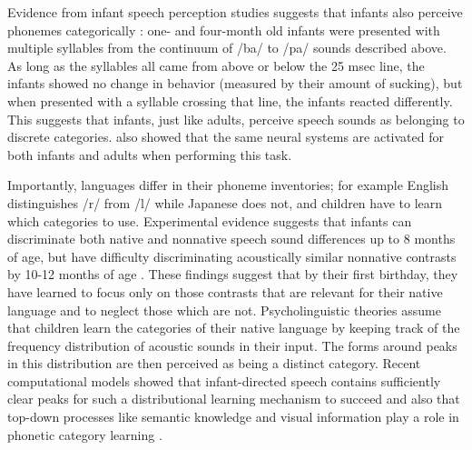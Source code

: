 Evidence from infant speech perception studies suggests that infants
also perceive phonemes categorically  \citep{eimas1971speech}: one-
and four-month old infants were presented with multiple syllables from
the continuum of /ba/ to /pa/ sounds described above. As long as the
syllables all came from above or below the 25 msec line, the infants
showed no change in behavior (measured by their amount of sucking),
but when presented with a syllable crossing that line, the infants
reacted differently. This suggests that infants, just like adults, perceive speech sounds as belonging to discrete categories. \citet{dehaene2004common} also showed that the same neural systems are activated for both infants and adults when performing this task.

Importantly, languages differ in their phoneme inventories; for example English distinguishes /r/ from /l/ while Japanese does not, and children have to learn which categories to use. Experimental evidence suggests that infants can discriminate both native and nonnative speech sound differences up to 8 months of age, but have difficulty discriminating acoustically similar nonnative contrasts by 10-12 months of age \citep{werker2015critical}. These findings suggest that by their first birthday, they have learned to focus only on those contrasts that are relevant for their native language and to neglect those which are not. Psycholinguistic theories assume that children learn the categories of their native language by keeping track of the frequency distribution of acoustic sounds in their input. The forms around peaks in this distribution are then perceived as being a distinct category. Recent computational models showed that infant-directed speech contains sufficiently clear peaks for such a distributional learning mechanism to succeed and also that top-down processes like semantic knowledge and visual information play a role in phonetic category learning \citep{ter2016semantics}.


